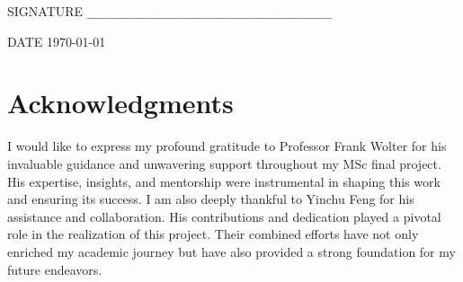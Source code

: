 \documentclass[twocolumn,11pt]{report}
\begin{document}
\vspace*{1in}

\noindent SIGNATURE \verb!______________________________________!

\noindent DATE \hspace*{.4in}  \today

\vspace*{1in}




\newpage


\chapter*{\center Acknowledgments}

I would like to express my profound gratitude to Professor Frank Wolter for his invaluable guidance and unwavering support throughout my MSc final project. His expertise, insights, and mentorship were instrumental in shaping this work and ensuring its success. I am also deeply thankful to Yinchu Feng for his assistance and collaboration. His contributions and dedication played a pivotal role in the realization of this project. Their combined efforts have not only enriched my academic journey but have also provided a strong foundation for my future endeavors.

\newpage



\tableofcontents



\listoffigures


\listoftables
\end{document}
